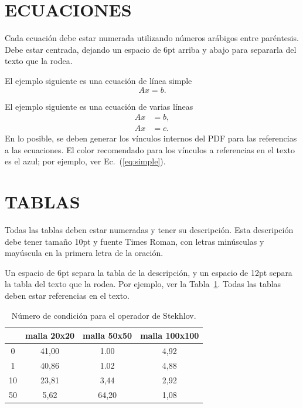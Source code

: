 \documentclass[oneside,a4paper,spanish,links]{amca}
\begin{document}
\section{ECUACIONES}

Cada ecuación debe estar numerada utilizando números arábigos
entre paréntesis. Debe estar centrada, dejando un espacio de 6pt
arriba y abajo para separarla del texto que la rodea.

El ejemplo siguiente es una ecuación de línea simple
%
\begin{equation}
Ax = b.
\end{equation}

El ejemplo siguiente es una ecuación de varias líneas
%
\begin{equation} \label{eq:simple}
\begin{aligned}
Ax& = b,\\
Ax& = c.
\end{aligned}
\end{equation}
%
En lo posible, se deben generar los vínculos internos del PDF para
las referencias a las ecuaciones. El color recomendado para los
vínculos a referencias en el texto es el azul; por ejemplo, ver
Ec.~(\ref{eq:simple}).

\section{TABLAS}

Todas las tablas deben estar numeradas y tener su descripción.
Esta descripción debe tener tamaño 10pt y fuente Times Roman, con
letras minúsculas y mayúscula en la primera letra de la oración.

Un espacio de 6pt separa la tabla de la descripción, y un espacio de 12pt
separa la tabla del texto que la rodea. Por ejemplo, ver la
Tabla~\ref{tab:n50}. Todas las tablas deben estar referencias en el texto.

\begin{table}[htb]
\centering
\begin{tabular}{|c|c|c|c|}
\hline  & malla 20x20  & malla 50x50  & malla 100x100 \\
\hline
\hline
 0 & 41,00 & 1.00 & 4,92\\
\hline
 1 & 40,86 & 1.02 & 4,88 \\
\hline
10 & 23,81 & 3,44 & 2,92 \\
\hline
50 & 5,62 & 64,20 & 1,08 \\
\hline
\end{tabular}
\caption{Número de condición para el operador de Stekhlov.}
\label{tab:n50}
\end{table}
\end{document}

